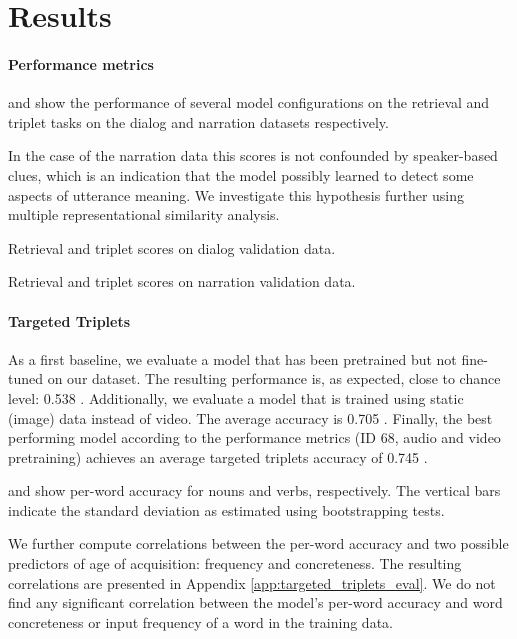 \section{Results}
\label{sec:results}
\paragraph{Performance metrics}
 and  show
the performance of several model configurations on the retrieval and
triplet tasks on the dialog and narration datasets respectively.

In the case of the narration data this scores is not confounded by
speaker-based clues, which is an indication that the model possibly
learned to detect some aspects of utterance meaning. We investigate
this hypothesis further using multiple representational similarity
analysis.
 

 \begin{table}
   \centering
   
   \caption{Retrieval and triplet scores on dialog validation data.}
   \label{tab:scores-dialog}
 \end{table}

\begin{table}
   \centering
   
   \caption{Retrieval and triplet scores on narration validation data.}
   \label{tab:scores-narration}
 \end{table}
 
\paragraph{Targeted Triplets}
As a first baseline, we evaluate a model that has been pretrained but not fine-tuned on our dataset. The resulting performance is, as expected, close to chance level: 0.538 . Additionally, we evaluate a model that is trained using static (image) data instead of video. The average accuracy is 0.705 . Finally, the best performing model according to the
performance metrics (ID 68, audio and video pretraining) achieves an average
targeted triplets accuracy of 0.745 .

 and
 show per-word
accuracy for nouns and verbs, respectively. The vertical
bars indicate the standard deviation as estimated using bootstrapping
tests.

We further compute correlations between the per-word accuracy and two possible predictors of age of acquisition: frequency and concreteness. The resulting correlations are presented in Appendix \ref{app:targeted_triplets_eval}. We do not find any significant correlation between the model's per-word accuracy and word concreteness or input frequency of a word in the training data.




